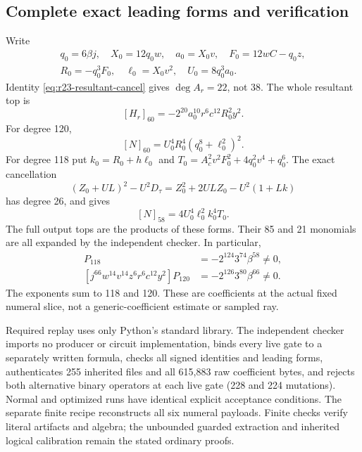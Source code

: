 \subsection{Complete exact leading forms and verification}
Write
\begin{gather*}
 q_0=6\beta j,\quad X_0=12q_0w,\quad a_0=X_0v,\quad F_0=12wC-q_0z,\\
 R_0=-q_0^3F_0,\quad \ell_0=X_0v^2,\quad U_0=8q_0^3a_0.
\end{gather*}
Identity \eqref{eq:r23-resultant-cancel} gives $\deg A_r=22$, not 38.
The whole resultant top is
\[
 [H_r]_{60}=-2^{20}a_0^{10}r^6c^{12}R_0^2y^2.
\]
For degree 120,
\[
 [N]_{60}=U_0^4R_0^4(q_0^8+\ell_0^2)^2.
\]
For degree 118 put $k_0=R_0+h\ell_0$ and
$T_0=A_c^2v^2F_0^2+4q_0^2v^4+q_0^6$. The exact cancellation
\[
 (Z_0+UL)^2-U^2D_\tau=Z_0^2+2ULZ_0-U^2(1+Lk)
\]
has degree 26, and gives
\[
 [N]_{58}=4U_0^4\ell_0^2k_0^4T_0.
\]
The full output tops are the products of these forms. Their 85 and 21
monomials are all expanded by the independent checker. In particular,
\begin{align*}
 [j^{58}w^{16}v^{18}z^6r^6c^{12}y^2]P_{118}
    &=-2^{124}3^{74}\beta^{58}\ne0,\\
 [j^{66}w^{14}v^{14}z^6r^6c^{12}y^2]P_{120}
    &=-2^{126}3^{80}\beta^{66}\ne0.
\end{align*}
The exponents sum to 118 and 120. These are coefficients at the actual fixed
numeral slice, not a generic-coefficient estimate or sampled ray.

Required replay uses only Python's standard library. The independent checker
imports no producer or circuit implementation, binds every live gate to a
separately written formula, checks all signed identities and leading forms,
authenticates 255 inherited files and all 615,883 raw coefficient bytes, and
rejects both alternative binary operators at each live gate (228 and 224
mutations). Normal and optimized runs have identical explicit acceptance
conditions. The separate finite recipe reconstructs all six numeral payloads.
Finite checks verify literal artifacts and algebra; the unbounded guarded
extraction and inherited logical calibration remain the stated ordinary proofs.
